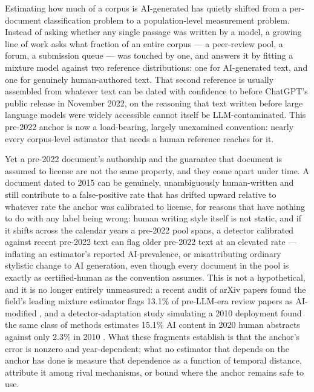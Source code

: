 \documentclass[11pt]{article}
\begin{document}
Estimating how much of a corpus is AI-generated has quietly shifted from a per-document classification problem to a population-level measurement problem. Instead of asking whether any single passage was written by a model, a growing line of work asks what fraction of an entire corpus --- a peer-review pool, a forum, a submission queue --- was touched by one, and answers it by fitting a mixture model against two reference distributions: one for AI-generated text, and one for genuinely human-authored text. That second reference is usually assembled from whatever text can be dated with confidence to before ChatGPT's public release in November 2022, on the reasoning that text written before large language models were widely accessible cannot itself be LLM-contaminated. This pre-2022 anchor is now a load-bearing, largely unexamined convention: nearly every corpus-level estimator that needs a human reference reaches for it.

Yet a pre-2022 document's authorship and the guarantee that document is assumed to license are not the same property, and they come apart under time. A document dated to 2015 can be genuinely, unambiguously human-written and still contribute to a false-positive rate that has drifted upward relative to whatever rate the anchor was calibrated to license, for reasons that have nothing to do with any label being wrong: human writing style itself is not static, and if it shifts across the calendar years a pre-2022 pool spans, a detector calibrated against recent pre-2022 text can flag older pre-2022 text at an elevated rate --- inflating an estimator's reported AI-prevalence, or misattributing ordinary stylistic change to AI generation, even though every document in the pool is exactly as certified-human as the convention assumes. This is not a hypothetical, and it is no longer entirely unmeasured: a recent audit of arXiv papers found the field's leading mixture estimator flags 13.1\% of pre-LLM-era review papers as AI-modified \citep{LLMGeneratedOrHumanWritten}, and a detector-adaptation study simulating a 2010 deployment found the same class of methods estimates 15.1\% AI content in 2020 human abstracts against only 2.3\% in 2010 \citep{MovingTargetTTA}. What these fragments establish is that the anchor's error is nonzero and year-dependent; what no estimator that depends on the anchor has done is measure that dependence as a function of temporal distance, attribute it among rival mechanisms, or bound where the anchor remains safe to use.
\end{document}
